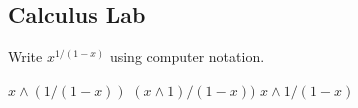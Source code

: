 \documentclass[addpoints]{exam}
\begin{document}
\begin{questions}
\section{Calculus Lab}
\question Write $x^{1/(1-x)}$ using computer notation.
\begin{oneparchoices}
	\correctchoice $x\wedge(1/(1-x))$
	\choice $(x\wedge 1)/(1-x))$
	\choice $x\wedge 1/(1-x)$
	\end{oneparchoices}

\end{questions}
\end{document}
